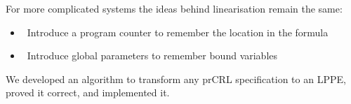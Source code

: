 \begin{block}{\large {}\vphantom{Introduction}}
\vskip36pt 

For more complicated systems the ideas behind linearisation remain the same:
\begin{adjustwidth}{0.5cm}{0.5cm}
\begin{itemize}
\item \ Introduce a \alert{program counter} to remember the location in the formula
\item \ Introduce \alert{global parameters} to remember bound variables
\end{itemize}
\end{adjustwidth}
\vskip10pt
We developed an \alert{algorithm} to transform any prCRL specification to an LPPE, \alert{proved it correct}, and \alert{implemented} it.




%	


\end{block}

